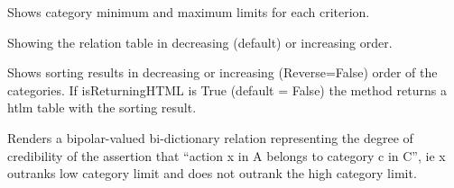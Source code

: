 \documentclass[letterpaper,10pt,english]{sphinxmanual}
\begin{document}
\begin{fulllineitems}
\begin{fulllineitems}
\end{fulllineitems}


\begin{fulllineitems}
\label{techDoc:sortingDigraphs.SortingDigraph.showCriteriaCategoryLimits}
Shows category minimum and maximum limits for each criterion.

\end{fulllineitems}


\begin{fulllineitems}
\label{techDoc:sortingDigraphs.SortingDigraph.showOrderedRelationTable}
Showing the relation table in decreasing (default) or increasing order.

\end{fulllineitems}


\begin{fulllineitems}
\label{techDoc:sortingDigraphs.SortingDigraph.showSorting}
Shows sorting results in decreasing or increasing (Reverse=False)
order of the categories. If isReturningHTML is True (default = False)
the method returns a htlm table with the sorting result.

\end{fulllineitems}


\begin{fulllineitems}
\label{techDoc:sortingDigraphs.SortingDigraph.showSortingCharacteristics}
Renders a bipolar-valued bi-dictionary relation
representing the degree of credibility of the
assertion that ``action x in A belongs to category c in C'',
ie x outranks low category limit and does not outrank
the high category limit.

\end{fulllineitems}


\end{fulllineitems}
\end{document}
